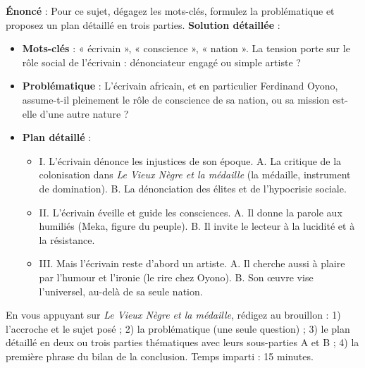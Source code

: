 \documentclass[11pt]{article}
\begin{document}
\begin{exoresolu}
\textbf{Énoncé} : Pour ce sujet, dégagez les mots-clés, formulez la problématique et proposez un plan détaillé en trois parties.
\tcblower
\textbf{Solution détaillée} :
\begin{itemize}
\item \textbf{Mots-clés} : « écrivain », « conscience », « nation ». La tension porte sur le rôle social de l'écrivain : dénonciateur engagé ou simple artiste ?
\item \textbf{Problématique} : L'écrivain africain, et en particulier Ferdinand Oyono, assume-t-il pleinement le rôle de conscience de sa nation, ou sa mission est-elle d'une autre nature ?
\item \textbf{Plan détaillé} :
\begin{itemize}
\item I. L'écrivain dénonce les injustices de son époque. A. La critique de la colonisation dans \emph{Le Vieux Nègre et la médaille} (la médaille, instrument de domination). B. La dénonciation des élites et de l'hypocrisie sociale.
\item II. L'écrivain éveille et guide les consciences. A. Il donne la parole aux humiliés (Meka, figure du peuple). B. Il invite le lecteur à la lucidité et à la résistance.
\item III. Mais l'écrivain reste d'abord un artiste. A. Il cherche aussi à plaire par l'humour et l'ironie (le rire chez Oyono). B. Son œuvre vise l'universel, au-delà de sa seule nation.
\end{itemize}
\end{itemize}
\end{exoresolu}

\begin{exercice}
En vous appuyant sur \emph{Le Vieux Nègre et la médaille}, rédigez au brouillon : 1) l'accroche et le sujet posé ; 2) la problématique (une seule question) ; 3) le plan détaillé en deux ou trois parties thématiques avec leurs sous-parties A et B ; 4) la première phrase du bilan de la conclusion. Temps imparti : 15 minutes.
\end{exercice}
\end{document}
